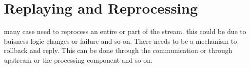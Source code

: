 \section{Replaying and Reprocessing}

many case need to reprocess an entire or part of the stream. this could be due to buisness logic changes or failure and so on. There needs to be a mechanism to rollback and reply. This can be done through the communication or through upstream or the processing component and so on.

